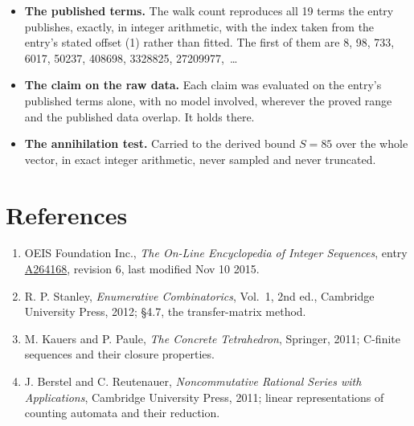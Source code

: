 \documentclass[11pt]{article}
\theoremstyle{definition}
\begin{document}
\begin{itemize}

\item {\bfseries The published terms.} The walk count reproduces all 19 terms the entry publishes, exactly, in integer arithmetic, with the index taken from the entry's stated offset (1) rather than fitted. The first of them are 8, 98, 733, 6017, 50237, 408698, 3328825, 27209977,~\dots

\item {\bfseries The claim on the raw data.} Each claim was evaluated on the entry's published terms alone, with no model involved, wherever the proved range and the published data overlap. It holds there.

\item {\bfseries The annihilation test.} Carried to the derived bound $S = 85$ over the whole vector, in exact integer arithmetic, never sampled and never truncated.

\end{itemize}

\section{References}

\begin{enumerate}

\item OEIS Foundation Inc., \emph{The On-Line Encyclopedia of Integer Sequences}, entry \href{https://oeis.org/A264168}{A264168}, revision 6, last modified Nov 10 2015.

\item R. P. Stanley, \emph{Enumerative Combinatorics}, Vol.~1, 2nd ed., Cambridge University Press, 2012; \S4.7, the transfer-matrix method.

\item M. Kauers and P. Paule, \emph{The Concrete Tetrahedron}, Springer, 2011; C-finite sequences and their closure properties.

\item J. Berstel and C. Reutenauer, \emph{Noncommutative Rational Series with Applications}, Cambridge University Press, 2011; linear representations of counting automata and their reduction.

\end{enumerate}
\end{document}
